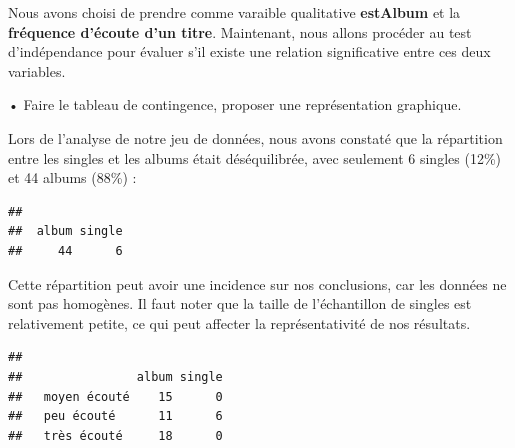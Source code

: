 \documentclass[
]{article}
\newenvironment{Shaded}{\begin{snugshade}}{\end{snugshade}}
\newcommand{\CommentTok}[1]{\textcolor[rgb]{0.56,0.35,0.01}{\textit{#1}}}
\newcommand{\FunctionTok}[1]{\textcolor[rgb]{0.00,0.00,0.00}{#1}}
\newcommand{\NormalTok}[1]{#1}
\newcommand{\OtherTok}[1]{\textcolor[rgb]{0.56,0.35,0.01}{#1}}
\newcommand{\SpecialCharTok}[1]{\textcolor[rgb]{0.00,0.00,0.00}{#1}}
\begin{document}
Nous avons choisi de prendre comme varaible qualitative
\textbf{estAlbum} et la \textbf{fréquence d'écoute d'un titre}.
Maintenant, nous allons procéder au test d'indépendance pour évaluer
s'il existe une relation significative entre ces deux variables.

• Faire le tableau de contingence, proposer une représentation
graphique.

Lors de l'analyse de notre jeu de données, nous avons constaté que la
répartition entre les singles et les albums était déséquilibrée, avec
seulement 6 singles (12\%) et 44 albums (88\%) :

\begin{Shaded}
\end{Shaded}

\begin{verbatim}
## 
##  album single 
##     44      6
\end{verbatim}

Cette répartition peut avoir une incidence sur nos conclusions, car les
données ne sont pas homogènes. Il faut noter que la taille de
l'échantillon de singles est relativement petite, ce qui peut affecter
la représentativité de nos résultats.

\begin{Shaded}
\end{Shaded}

\begin{verbatim}
##               
##                album single
##   moyen écouté    15      0
##   peu écouté      11      6
##   très écouté     18      0
\end{verbatim}
\end{document}
